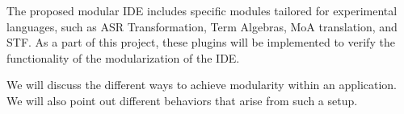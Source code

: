The proposed modular IDE includes specific modules tailored for experimental
languages, such as ASR Transformation, Term Algebras, MoA translation, and STF.
As a part of this project, these plugins will be implemented to verify the
functionality of the modularization of the IDE.

We will discuss the different ways to achieve modularity within
an application. We will also point out different behaviors that arise from such
a setup.
